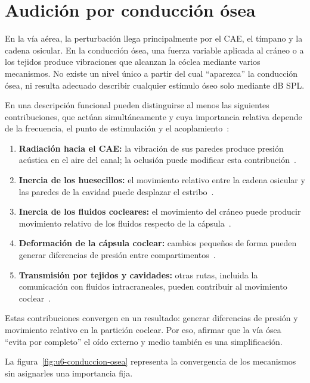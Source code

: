 \section{Audición por conducción ósea}
\label{sec:u6-conduccion-osea}

En la vía aérea, la perturbación llega principalmente por el CAE, el tímpano y
la cadena osicular. En la conducción ósea, una fuerza variable aplicada al
cráneo o a los tejidos produce vibraciones que alcanzan la cóclea mediante
varios mecanismos. No existe un nivel único a partir del cual ``aparezca'' la
conducción ósea, ni resulta adecuado describir cualquier estímulo óseo solo
mediante dB SPL.

En una descripción funcional pueden distinguirse al menos las
siguientes contribuciones, que actúan simultáneamente y cuya importancia
relativa depende de la frecuencia, el punto de estimulación y el
acoplamiento~\cite{stenfeltGoode2005}:

\begin{enumerate}
    \item \textbf{Radiación hacia el CAE:} la vibración de sus paredes
    produce presión acústica en el aire del canal; la oclusión puede modificar
    esta contribución~\cite{stenfeltGoode2005}.
    \item \textbf{Inercia de los huesecillos:} el movimiento relativo
    entre la cadena osicular y las paredes de la cavidad puede desplazar el
    estribo~\cite{stenfeltGoode2005}.
    \item \textbf{Inercia de los fluidos cocleares:} el movimiento del
    cráneo puede producir movimiento relativo de los fluidos respecto de la
    cápsula~\cite{stenfeltGoode2005}.
    \item \textbf{Deformación de la cápsula coclear:} cambios pequeños
    de forma pueden generar diferencias de presión entre compartimentos~\cite{stenfeltGoode2005}.
    \item \textbf{Transmisión por tejidos y cavidades:} otras rutas,
    incluida la comunicación con fluidos intracraneales, pueden contribuir al
    movimiento coclear~\cite{stenfeltGoode2005}.
\end{enumerate}

Estas contribuciones convergen en un resultado: generar diferencias de
presión y movimiento relativo en la partición coclear. Por eso, afirmar que la
vía ósea ``evita por completo'' el oído externo y medio también es una
simplificación.

La figura~\ref{fig:u6-conduccion-osea} representa la convergencia de los
mecanismos sin asignarles una importancia fija.

